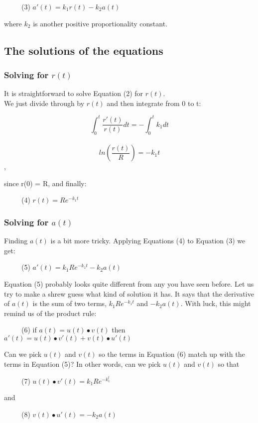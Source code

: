 \documentclass[]{article}
\begin{document}
~~~~~(3) \(a'(t) = k_1r(t)-k_2a(t)\)

where \(k_2\) is another positive proportionality constant.

\subsection{The solutions of the
equations}\label{the-solutions-of-the-equations}

\subsubsection{\texorpdfstring{Solving for
\(r(t)\)}{Solving for r(t)}}\label{solving-for-rt}

It is straightforward to solve Equation (2) for \(r(t)\).\\
We just divide through by \(r(t)\) and then integrate from 0 to t:

\[\int_0^t \frac{r'(t)}{r(t)} dt= - \int_0^t k_1dt\]\\
\[ln(\frac{r(t)}{R}) = -k_1t\],

since r(0) = R, and finally:

~~~~~(4) \(r(t) = Re^{-k_1t}\)

\subsubsection{\texorpdfstring{Solving for
\(a(t)\)}{Solving for a(t)}}\label{solving-for-at}

Finding \(a(t)\) is a bit more tricky. Applying Equations (4) to
Equation (3) we get:

~~~~~(5) \(a'(t) = k_1Re^{-k_1t}-k_2a(t)\)

Equation (5) probably looks quite different from any you have seen
before. Let us try to make a shrew guess what kind of solution it has.
It says that the derivative of \(a(t)\) is the sum of two terms,
\(k_1Re^{-k_1t}\) and \(-k_2a(t)\). With luck, this might remind us of
the product rule:

~~~~~(6) if \(a(t) = u(t) \bullet v(t)\) then
\(a'(t) = u(t) \bullet v'(t) + v(t) \bullet u'(t)\)

Can we pick \(u(t)\) and \(v(t)\) so the terms in Equation (6) match up
with the terms in Equation (5)? In other words, can we pick \(u(t)\) and
\(v(t)\) so that

~~~~~(7) \(u(t) \bullet v'(t) = k_1Re^{-k_1^t}\)

and

~~~~~(8) \(v(t) \bullet u'(t) = -k_2a(t)\)
\end{document}
